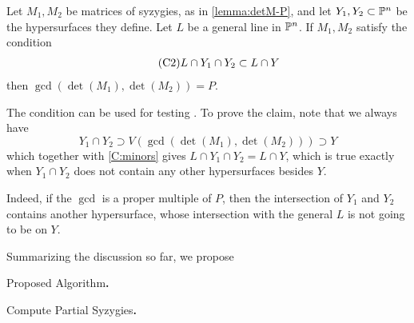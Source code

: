 \documentclass[fleqn,reqno]{amsart}
\begin{document}
\begin{paragraf}
Let $M_1,M_2$ be matrices of syzygies, as in \eqref{lemma:detM-P},
and let $Y_1,Y_2\subset\mathbb{P}^n$ be the hypersurfaces they define.
Let $L$ be a general line in $\mathbb{P}^n$.
If $M_1,M_2$ satisfy the condition
\begin{align}
	\label{C:minors}
	\tag{C2}
	L\cap Y_1\cap Y_2\subset L\cap Y
\end{align}
then $\gcd(\det(M_1),\det(M_2))=P$.

The condition can be used for testing .
To prove the claim, note that we always have
\[
	Y_1\cap Y_2\supset V(\gcd(\det(M_1),\det(M_2)))\supset Y
\]
which together with \eqref{C:minors} gives $L\cap Y_1\cap Y_2=L\cap Y$,
which is true exactly when $Y_1\cap Y_2$ does not contain any other hypersurfaces besides $Y$.

Indeed, if the $\gcd$ is a proper multiple of $P$, then the intersection of
$Y_1$ and $Y_2$ contains another hypersurface, whose intersection with the general $L$
is not going to be on $Y$.
\end{paragraf}

\begin{paragraf*}
Summarizing the discussion so far, we propose
\end{paragraf*}

\begin{algorithm}{\sc Proposed Algorithm}{\bf.}
\label{algo:proposed}
\begin{algorithmic}
\State{}
\EndWhile
{}
\end{algorithmic}
\end{algorithm}

\begin{algorithm}{\sc Compute Partial Syzygies}{\bf.}
\label{algo:compute-Ni}
\begin{algorithmic}
\EndFor
{}
\end{algorithmic}
\end{algorithm}
\end{document}
